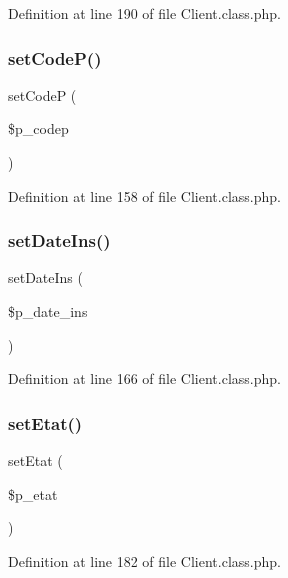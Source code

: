 Definition at line 190 of file Client.\+class.\+php.

\mbox{\label{class_client_adaeb4fb4717afd2a42022d026f25bf1c}} 
\subsubsection{\texorpdfstring{set\+Code\+P()}{setCodeP()}}
{\footnotesize\ttfamily set\+CodeP (\begin{DoxyParamCaption}\item[{}]{\$p\+\_\+codep }\end{DoxyParamCaption})}



Definition at line 158 of file Client.\+class.\+php.

\mbox{\label{class_client_a3c392997e2690d556e86fbca37a16d48}} 
\subsubsection{\texorpdfstring{set\+Date\+Ins()}{setDateIns()}}
{\footnotesize\ttfamily set\+Date\+Ins (\begin{DoxyParamCaption}\item[{}]{\$p\+\_\+date\+\_\+ins }\end{DoxyParamCaption})}



Definition at line 166 of file Client.\+class.\+php.

\mbox{\label{class_client_a21154c09e82e11def93b643adb6a39fe}} 
\subsubsection{\texorpdfstring{set\+Etat()}{setEtat()}}
{\footnotesize\ttfamily set\+Etat (\begin{DoxyParamCaption}\item[{}]{\$p\+\_\+etat }\end{DoxyParamCaption})}



Definition at line 182 of file Client.\+class.\+php.

